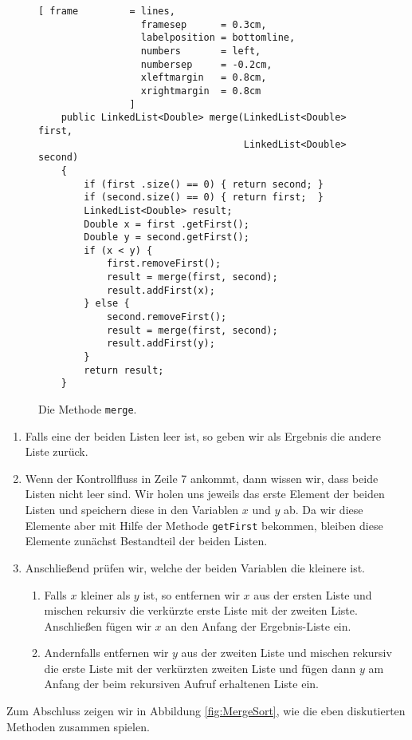 \begin{figure}[!ht]
  \centering
\begin{Verbatim}[ frame         = lines, 
                  framesep      = 0.3cm, 
                  labelposition = bottomline,
                  numbers       = left,
                  numbersep     = -0.2cm,
                  xleftmargin   = 0.8cm,
                  xrightmargin  = 0.8cm
                ]
    public LinkedList<Double> merge(LinkedList<Double> first, 
                                    LinkedList<Double> second) 
    {
        if (first .size() == 0) { return second; }
        if (second.size() == 0) { return first;  }
        LinkedList<Double> result;
        Double x = first .getFirst();
        Double y = second.getFirst();
        if (x < y) {
            first.removeFirst();
            result = merge(first, second);
            result.addFirst(x);
        } else {
            second.removeFirst();
            result = merge(first, second);
            result.addFirst(y);
        }
        return result;
    }
\end{Verbatim}
\vspace*{-0.3cm}
  \caption{Die Methode \texttt{merge}.}
  \label{fig:merge}
\end{figure}

\begin{enumerate}
\item Falls eine der beiden Listen leer ist, so geben wir als Ergebnis die
      andere Liste zur\"uck.
\item Wenn der Kontrollfluss in Zeile 7 ankommt, dann wissen wir, dass beide Listen
      nicht leer sind.  Wir holen uns jeweils das erste Element der beiden Listen
      und speichern diese in den Variablen $x$ und $y$ ab.  Da wir diese Elemente
      aber mit Hilfe der Methode \texttt{getFirst} bekommen, bleiben diese Elemente
      zun\"achst Bestandteil der beiden Listen.
\item Anschlie\ss{}end pr\"ufen wir, welche der beiden Variablen die kleinere ist.
      \begin{enumerate}
      \item Falls $x$ kleiner als $y$ ist, so entfernen wir $x$ aus der ersten Liste
            und mischen rekursiv die verk\"urzte erste Liste mit der zweiten Liste.
            Anschlie\ss{}en f\"ugen wir $x$ an den Anfang der Ergebnis-Liste ein.
      \item Andernfalls entfernen wir $y$ aus der zweiten Liste
            und mischen rekursiv die erste Liste mit der verk\"urzten zweiten Liste und
            f\"ugen dann $y$ am Anfang der beim rekursiven Aufruf erhaltenen Liste ein.
      \end{enumerate}
\end{enumerate}
Zum Abschluss zeigen wir in Abbildung \ref{fig:MergeSort}, wie die eben diskutierten
Methoden zusammen spielen.

